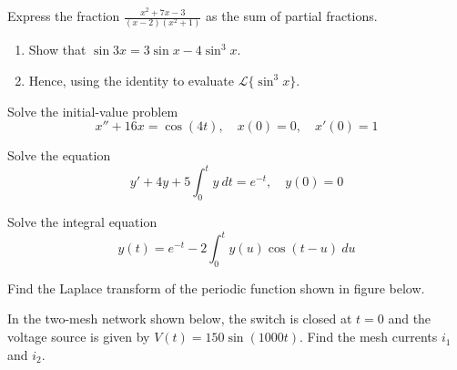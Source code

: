 \begin{mdframed}
    \vspace{-0.25cm}
    \hspace{-0.25cm}
    \begin{Exercise}
        Express the fraction $\displaystyle \frac{x^2 + 7x - 3}{(x-2)(x^2 + 1)}$ as the sum of partial fractions.
    \end{Exercise}

    \begin{Exercise}
        \begin{enumerate}
            \item Show that $\sin 3x = 3 \sin x - 4\sin^3x$.
            \item Hence, using the identity to evaluate $\mathcal{L}\{\sin^3 x\}$.
        \end{enumerate}
    \end{Exercise}

    \begin{Exercise}
        
    \end{Exercise}

    \begin{Exercise}
        Solve the initial-value problem
        \[
            x'' + 16x = \cos(4t),\quad x(0) = 0,\quad x'(0) =1
        \]
    \end{Exercise}

    \begin{Exercise}
        Solve the equation
        \[
            y' + 4y + 5\int_{0}^{t} y \> dt = e^{-t}, \quad y(0) = 0
        \]
    \end{Exercise}

    \begin{Exercise}
        Solve the integral equation
        \[
            y(t) = e^{-t} - 2\int_{0}^{t} y(u) \cos(t-u) \> du
        \]
    \end{Exercise}

    \begin{Exercise}
        Find the Laplace transform of the periodic function shown in figure below.

        
    \end{Exercise}

    \begin{Exercise}
        In the two-mesh network shown below, the switch is closed at $t = 0$ and the voltage source is given by
    $V(t) = 150 \sin(1000t)$. Find the mesh currents $i_1$ and $i_2$.


\end{Exercise}
\end{mdframed}
